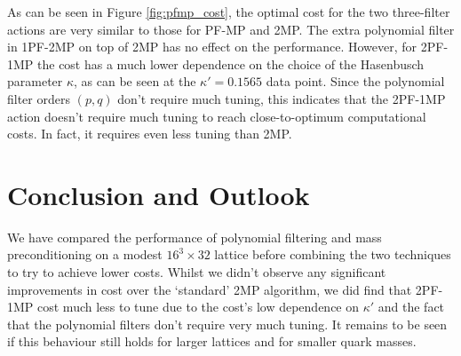 As can be seen in Figure \ref{fig:pfmp_cost}, the optimal cost for the two three-filter actions are very similar to those for PF-MP and 2MP.
The extra polynomial filter in 1PF-2MP on top of 2MP has no effect on the performance.
However, for 2PF-1MP the cost has a much lower dependence on the choice of the Hasenbusch parameter $\kappa$, as can be seen at the $\kappa' = 0.1565$ data point.
Since the polynomial filter orders $(p,q)$ don't require much tuning, this indicates that the 2PF-1MP action doesn't require much tuning to reach close-to-optimum computational costs.
In fact, it requires even less tuning than 2MP.


\section{Conclusion and Outlook} \label{sec:conclusion}
We have compared the performance of polynomial filtering and mass preconditioning on a modest $16^3 \times 32$ lattice before combining the two techniques to try to achieve lower costs.
Whilst we didn't observe any significant improvements in cost over the `standard' 2MP algorithm, we did find that 2PF-1MP cost much less to tune due to the cost's low dependence on $\kappa'$ and the fact that the polynomial filters don't require very much tuning.
It remains to be seen if this behaviour still holds for larger lattices and for smaller quark masses.
